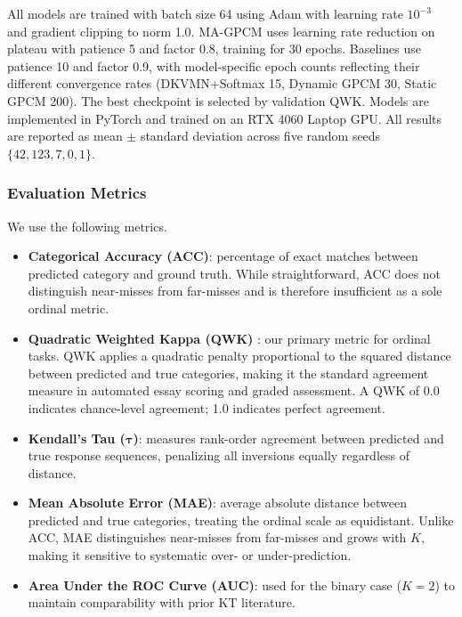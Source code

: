 \documentclass[pdflatex,sn-apa]{sn-jnl}
\begin{document}
All models are trained with batch size 64 using Adam with learning rate $10^{-3}$ and gradient clipping to norm 1.0. MA-GPCM uses learning rate reduction on plateau with patience 5 and factor 0.8, training for 30 epochs. Baselines use patience 10 and factor 0.9, with model-specific epoch counts reflecting their different convergence rates (DKVMN+Softmax 15, Dynamic GPCM 30, Static GPCM 200). The best checkpoint is selected by validation QWK. Models are implemented in PyTorch and trained on an RTX 4060 Laptop GPU. All results are reported as mean $\pm$ standard deviation across five random seeds $\{42, 123, 7, 0, 1\}$.

\subsubsection{Evaluation Metrics}
We use the following metrics.
\begin{itemize}
    \item \textbf{Categorical Accuracy (ACC)}: percentage of exact matches between predicted category and ground truth. While straightforward, ACC does not distinguish near-misses from far-misses and is therefore insufficient as a sole ordinal metric.
    \item \textbf{Quadratic Weighted Kappa (QWK)} \citep{cohen_weighted_1968}: our primary metric for ordinal tasks. QWK applies a quadratic penalty proportional to the squared distance between predicted and true categories, making it the standard agreement measure in automated essay scoring and graded assessment. A QWK of 0.0 indicates chance-level agreement; 1.0 indicates perfect agreement.
    \item \textbf{Kendall's Tau ($\boldsymbol{\tau}$)}: measures rank-order agreement between predicted and true response sequences, penalizing all inversions equally regardless of distance.
    \item \textbf{Mean Absolute Error (MAE)}: average absolute distance between predicted and true categories, treating the ordinal scale as equidistant. Unlike ACC, MAE distinguishes near-misses from far-misses and grows with $K$, making it sensitive to systematic over- or under-prediction.
    \item \textbf{Area Under the ROC Curve (AUC)}: used for the binary case ($K=2$) to maintain comparability with prior KT literature.
\end{itemize}
\end{document}
